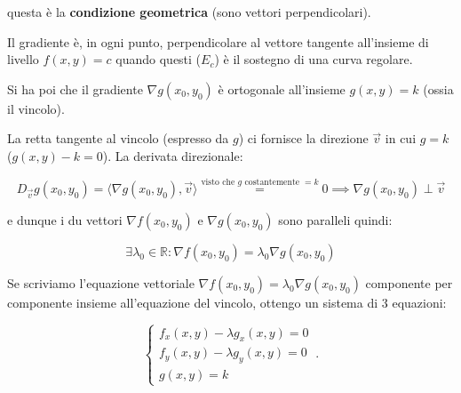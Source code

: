 \documentclass[../appunti-analisi.tex]{subfiles}
\begin{document}
questa è la \textbf{condizione geometrica} (sono vettori perpendicolari).

Il gradiente è, in ogni punto, perpendicolare al vettore tangente all'insieme di livello $f(x,y) = c$ quando questi ($E_c$) è il sostegno di una curva regolare.

Si ha poi che il gradiente $\nabla g(x_0,y_0)$ è ortogonale all'insieme $g(x,y) = k$ (ossia il vincolo).


La retta tangente al vincolo (espresso da $g$) ci fornisce la direzione $\vec{v}$ in cui $g=k$ ($g(x,y) -k=0$). La derivata direzionale:

\[
    D_{\vec{v}} g(x_0,y_0) = \langle \nabla g(x_0,y_0), \vec{v} \rangle \overset{\text{visto che $g$ costantemente $=k$}}{=} 0 \implies \nabla g(x_0,y_0) \perp \vec{v}
\]

e dunque i du vettori $\nabla f(x_0,y_0)$ e $\nabla g(x_0,y_0)$ sono paralleli quindi:

\[
\exists \lambda_0 \in \mathbb{R}: \nabla f(x_0,y_0) = \lambda_0 \nabla g(x_0,y_0)
\]



Se scriviamo l'equazione vettoriale $\nabla f(x_0,y_0) = \lambda_0 \nabla g(x_0,y_0)$ componente per componente insieme all'equazione del vincolo, ottengo un sistema di 3 equazioni:

\begin{equation}\label{eq:lagrangiana}
    \begin{cases}
           f_x(x,y) - \lambda g_x(x,y) = 0\\
           f_y(x,y) - \lambda g_y(x,y) = 0\\
           g(x,y) =k
    \end{cases}\,.
\end{equation}
\end{document}
